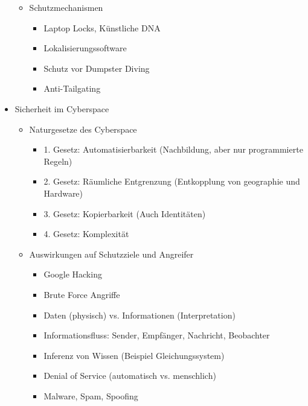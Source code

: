 \documentclass[11pt, paper=a4, twocolumn]{scrartcl}
\begin{document}
\begin{itemize}
\begin{itemize}
			\item Schutzmechanismen
				\begin{itemize}
					\item Laptop Locks, Künstliche DNA
					\item Lokalisierungssoftware
					\item Schutz vor Dumpster Diving
					\item Anti-Tailgating
				\end{itemize}
		\end{itemize}

	\item Sicherheit im Cyberspace
		\begin{itemize}
			\item Naturgesetze des Cyberspace
				\begin{itemize}
					\item 1. Gesetz: Automatisierbarkeit (Nachbildung, 
						aber nur programmierte Regeln)

					\item 2. Gesetz: Räumliche Entgrenzung 
						(Entkopplung von geographie und Hardware)
					\item 3. Gesetz: Kopierbarkeit (Auch Identitäten)
					\item 4. Gesetz: Komplexität 
				\end{itemize}
			
			\item Auswirkungen auf Schutzziele und Angreifer
				\begin{itemize}
					\item Google Hacking
					\item Brute Force Angriffe
					\item Daten (physisch) vs. Informationen 
						(Interpretation)
					\item Informationsfluss: Sender, Empfänger, 
						Nachricht, Beobachter
					\item Inferenz von Wissen (Beispiel 
						Gleichungssystem)
					\item Denial of Service (automatisch vs. 
						menschlich)
					\item Malware, Spam, Spoofing
				\end{itemize}

		\end{itemize}


\end{itemize}
\end{document}
